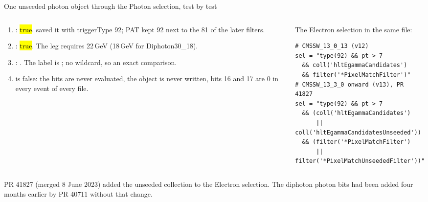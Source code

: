 \begin{frame}[fragile]{One unseeded photon object through the Photon selection, test by test}
  \begin{columns}[T]
    \begin{column}{0.52\linewidth}
      \begin{enumerate}\small
        \item {}: \hl{true}.  saved it with triggerType 92;
              PAT kept 92 next to the 81 of the later filters.
        \item {}: \hl{true}. The leg requires 22\,GeV (18\,GeV for Diphoton30\_18).
        \item {}: . The label is
              ; no wildcard, so an exact comparison.
        \item {} is false: the bits are never evaluated, the object is never written, bits 16
              and 17 are 0 in every event of every file.
      \end{enumerate}
    \end{column}
    \begin{column}{0.46\linewidth}
      {\scriptsize The Electron selection in the same file:}
\begin{lstlisting}
# CMSSW_13_0_13 (v12)
sel = "type(92) && pt > 7
  && coll('hltEgammaCandidates')
  && filter('*PixelMatchFilter')"
# CMSSW_13_3_0 onward (v13), PR 41827
sel = "type(92) && pt > 7
  && (coll('hltEgammaCandidates')
      || coll('hltEgammaCandidatesUnseeded'))
  && (filter('*PixelMatchFilter')
      || filter('*PixelMatchUnseededFilter'))"
\end{lstlisting}
    \end{column}
  \end{columns}
  \par\vspace{4pt}
  {\small PR 41827 (merged 8 June 2023) added the unseeded collection to the Electron selection. The diphoton photon
  bits had been added four months earlier by PR 40711 without that change.}
\end{frame}


